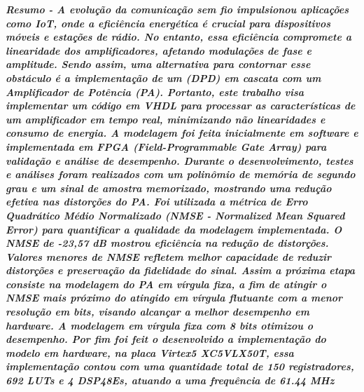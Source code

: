 \documentclass[twocolumn, a4paper]{article}
\begin{document}
\begin{strip}
  \vspace*{\dimexpr-\baselineskip-\stripsep\relax}
   \maketitle
  \vskip\baselineskip
\noindent %
  \vskip\baselineskip
\end{strip}

\thispagestyle{specialfooter}
\vspace{3pt}\textbf{\textit{Resumo - A evolução da comunicação sem fio impulsionou aplicações como IoT, onde a eficiência energética é crucial para dispositivos móveis e estações de rádio. No entanto, essa eficiência compromete a linearidade dos amplificadores, afetando modulações de fase e amplitude. Sendo assim, uma alternativa para contornar esse obstáculo é a implementação de um (DPD) em cascata com um Amplificador de Potência (PA). Portanto, este trabalho visa implementar um código em VHDL para processar as características de um amplificador em tempo real, minimizando não linearidades e consumo de energia. A modelagem foi feita inicialmente em software e implementada em FPGA (Field-Programmable Gate Array) para validação e análise de desempenho. Durante o desenvolvimento, testes e análises foram realizados com um polinômio de memória de segundo grau e um sinal de amostra memorizado, mostrando uma redução efetiva nas distorções do PA. Foi utilizada a métrica de Erro Quadrático Médio Normalizado (NMSE - Normalized Mean Squared Error) para quantificar a qualidade da modelagem implementada. O NMSE de -23,57 dB mostrou eficiência na redução de distorções. Valores menores de NMSE refletem melhor capacidade de reduzir distorções e preservação da fidelidade do sinal. Assim a próxima etapa consiste na modelagem do PA em vírgula fixa, a fim de atingir o NMSE mais próximo do atingido em vírgula flutuante com a menor resolução em bits, visando alcançar a melhor desempenho em hardware. A modelagem em vírgula fixa com 8 bits otimizou o desempenho. Por fim foi feit o desenvolvido a implementação do modelo em hardware, na placa Virtex5 XC5VLX50T, essa implementação contou com uma quantidade total de 150 registradores, 692 LUTs e 4 DSP48Es, atuando a uma frequência de 61.44 MHz}}
\end{document}
